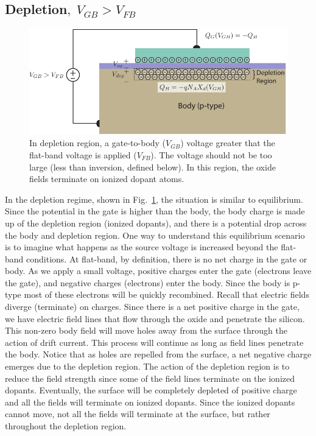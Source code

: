 \subsection{Depletion\texorpdfstring{$,\;V_{GB}>V_{FB}$}{}}
\begin{figure}[tbh]
\centering
\includegraphics[width=.75\columnwidth]{mos_cap_depletion}
\caption{In depletion region, a gate-to-body ($V_{GB}$) voltage greater that the flat-band voltage is applied ($V_{FB}$).  The voltage should not be too large (less than inversion, defined below).  In this region, the oxide fields terminate on ionized dopant atoms.}
\label{fig:mos_dep}
\end{figure}
In the depletion regime, shown in Fig.~\ref{fig:mos_dep}, the situation is similar to equilibrium.  Since the potential in the gate is higher than the body, the body charge is made up of the depletion region (ionized dopants), and there is a potential drop across the body and depletion region.  One way to understand this equilibrium scenario is to imagine what happens as the source voltage is increased beyond the flat-band conditions.  At flat-band, by definition, there is no net charge in the gate or body.  As we apply a small voltage, positive charges enter the gate (electrons leave the gate), and negative charges (electrons) enter the body. Since the body is p-type most of these electrons will be quickly recombined.  
Recall that electric fields diverge (terminate) on charges.  Since there is a net positive charge in the gate, we have electric field lines that flow through the oxide and penetrate the silicon.  This non-zero body field will move holes away from the surface through the action of drift current.  This process will continue as long as field lines penetrate the body.   Notice that as holes are repelled from the surface, a net negative charge emerges due to the depletion region.  The action of the depletion region is to reduce the field strength since some of the field lines terminate on the ionized dopants.  Eventually, the surface will be completely depleted of positive charge and all the fields will terminate on ionized dopants.  Since the ionized dopants cannot move, not all the fields will terminate at the surface, but rather throughout the depletion region.  
